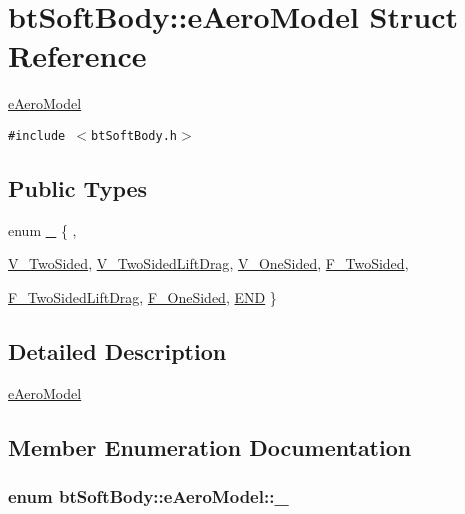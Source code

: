 \hypertarget{structbt_soft_body_1_1e_aero_model}{
\section{btSoftBody::eAeroModel Struct Reference}
\label{structbt_soft_body_1_1e_aero_model}
}
\hyperlink{structbt_soft_body_1_1e_aero_model}{eAeroModel}  


{\tt \#include $<$btSoftBody.h$>$}

\subsection*{Public Types}
\begin{CompactItemize}
\item 
enum \hyperlink{structbt_soft_body_1_1e_aero_model_147f4e50f7cfaa2855b5ea5b4b2986ae}{\_\-} \{ , \par
\hyperlink{structbt_soft_body_1_1e_aero_model_147f4e50f7cfaa2855b5ea5b4b2986ae112eb2723581b443eb31003e75769ced}{V\_\-TwoSided}, 
\hyperlink{structbt_soft_body_1_1e_aero_model_147f4e50f7cfaa2855b5ea5b4b2986ae91f6f6cec759e120ed1666ff684dae4a}{V\_\-TwoSidedLiftDrag}, 
\hyperlink{structbt_soft_body_1_1e_aero_model_147f4e50f7cfaa2855b5ea5b4b2986ae218d48cb6f6ce0640b193cc655ae05f7}{V\_\-OneSided}, 
\hyperlink{structbt_soft_body_1_1e_aero_model_147f4e50f7cfaa2855b5ea5b4b2986aeae33c1f5ebe9b125c044a4198b6ca3b4}{F\_\-TwoSided}, 
\par
\hyperlink{structbt_soft_body_1_1e_aero_model_147f4e50f7cfaa2855b5ea5b4b2986aebf0ee1be501b9fc3aafd6055c2a54c48}{F\_\-TwoSidedLiftDrag}, 
\hyperlink{structbt_soft_body_1_1e_aero_model_147f4e50f7cfaa2855b5ea5b4b2986ae975eb119297b6320316ed0cac16db8e3}{F\_\-OneSided}, 
\hyperlink{structbt_soft_body_1_1e_aero_model_147f4e50f7cfaa2855b5ea5b4b2986ae4b021d138b17f22f5e8fab9a253779f2}{END}
 \}
\end{CompactItemize}


\subsection{Detailed Description}
\hyperlink{structbt_soft_body_1_1e_aero_model}{eAeroModel} 

\subsection{Member Enumeration Documentation}
\hypertarget{structbt_soft_body_1_1e_aero_model_147f4e50f7cfaa2855b5ea5b4b2986ae}{
\subsubsection[\_\-]{\setlength{\rightskip}{0pt plus 5cm}enum {\bf btSoftBody::eAeroModel::\_\-}}}
\label{structbt_soft_body_1_1e_aero_model_147f4e50f7cfaa2855b5ea5b4b2986ae}


